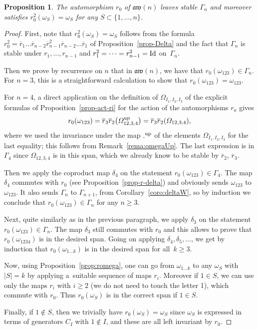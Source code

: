 \documentclass[10pt,a4paper]{amsart}
\numberwithin{equation}{section}
\newtheorem{prop}[theo]{Proposition}
\theoremstyle{definition}
\newcommand{\rb}{\overline{r}}
\newcommand{\aw}{\mathfrak{aw}(n)}
\begin{document}
\begin{prop}
The automorphism $r_0$ of $\aw$ leaves stable $\Gamma_n$ and moreover satisfies $r_0^2(\omega_S)=\omega_S$ for any $S\subset\{1,\dots,n\}$.
\end{prop}
\begin{proof}
First, note that $r_0^2(\omega_S)=\omega_S$ follows from the formula $r_0^2=\rb_1\dots \rb_{n-2}\rb_{n-1}^2\rb_{n-2}\dots \rb_1$ of Proposition~\ref{prop-Delta} and the fact that $\Gamma_n$ is stable under $r_1,\dots,r_{n-1}$ and $r_1^2=\dots=r_{n-1}^2={\rm Id}$ on~$\Gamma_n$.

Then we prove by recurrence on $n$ that in $\aw$, we have that $r_0(\omega_{123})\in\Gamma_n$. For $n=3$, this is a straightforward calculation to show that $r_0(\omega_{123})=\omega_{123}$.

For $n=4$, a direct application on the definition of $\varOmega_{I_1,I_2,I_3}$ of the explicit formulas of Proposition~\ref{prop-act-ri} for the action of the automorphisms $r_a$ gives
\[r_0(\omega_{123})=\rb_3\rb_2\big(\varOmega_{12,3,4}^{\rm up}\big)=\rb_3\rb_2(\varOmega_{12,3,4}) ,\]
where we used the invariance under the map ${.}^{\rm up}$ of the elements $\varOmega_{I_1,I_2,I_3}$ for the last equality; this follows from Remark~\ref{rema:omegaUp}. The last expression is in $\Gamma_4$ since $\varOmega_{12,3,4}$ is in this span, which we already know to be stable by $\rb_2$, $\rb_3$.

Then we apply the coproduct map $\delta_4$ on the statement $r_0(\omega_{123})\in\Gamma_4$. The map $\delta_4$ commutes with $r_0$ (see Proposition~\ref{prop-r-delta}) and obviously sends $\omega_{123}$ to $\omega_{123}$. It also sends $\Gamma_n$ to $\Gamma_{n+1}$, from Corollary~\ref{coro:deltaW}, so by induction we conclude that $r_0(\omega_{123})\in\Gamma_n$ for any $n\geq 3$.

Next, quite similarly as in the previous paragraph, we apply $\delta_3$ on the statement ${r_0(\omega_{123})\!\in\!\Gamma_n}$. The map $\delta_3$ still commutes with $r_0$ and this allows to prove that $r_0(\omega_{1234})$ is in the desired span. Going on applying $\delta_4,\delta_5,\dots $, we get by induction that $r_0(\omega_{1\dots k})$ is in the desired span for all~$k\geq 3$.

Now, using Proposition~\ref{prop:romega}, one can go from $\omega_{1\dots k}$ to any $\omega_S$ with $|S|=k$ by applying a~suitable sequence of maps $r_i$. Moreover if $1\in S$, we can use only the maps $r_i$ with $i\geq 2$ (we do not need to touch the letter 1), which commute with $r_0$. Thus $r_0(\omega_S)$ is in the correct span if $1\in S$.

Finally, if $1\notin S$, then we trivially have $r_0(\omega_S)=\omega_S$ since $\omega_S$ is expressed in terms of generators $C_I$ with $1\notin I$, and these are all left invariant by $r_0$.
\end{proof}
\end{document}
